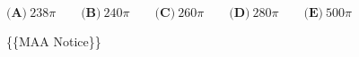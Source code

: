 \documentclass{article}
\begin{document}
\begin{enumerate}[label=\arabic*., itemsep=0.5em]
\( \textbf{(A)}\ 238\pi\qquad\textbf{(B)}\ 240\pi\qquad\textbf{(C)}\ 260\pi\qquad\textbf{(D)}\ 280\pi\qquad\textbf{(E)}\ 500\pi \)



\{\{MAA Notice\}\}\par \vspace{0.5em}\end{enumerate}
\end{document}
